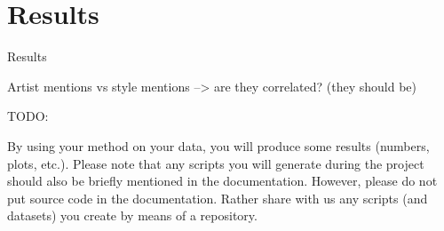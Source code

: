 \chapter{Results}
\label{cha:Results}
Results


Artist mentions vs style mentions --> are they correlated? (they should be)








TODO:

By using your method on your data, you will produce some
results (numbers, plots, etc.). Please note that any scripts
you will generate during the project should also be briefly
mentioned in the documentation. However, please do not
put source code in the documentation. Rather share with
us any scripts (and datasets) you create by means of a
repository.